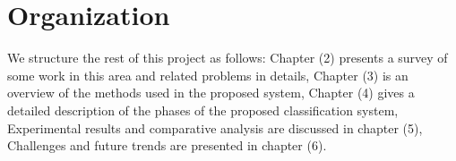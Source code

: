 \section{Organization}

We structure the rest of this project as follows: 
Chapter (2) presents a survey of some work in this area and related problems in details,
Chapter (3) is an overview of the methods used in the proposed system,
Chapter (4) gives a detailed description of the phases of the proposed classification system,
Experimental results and comparative analysis are discussed in chapter (5), 
Challenges and future trends are presented in chapter (6).

